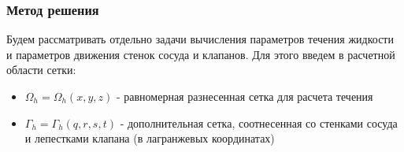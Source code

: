 \documentclass[14pt]{beamer}
\begin{document}
\begin{frame}
\frametitle{Метод решения}
Будем рассматривать отдельно задачи вычисления параметров течения жидкости и параметров движения стенок сосуда и клапанов. Для этого введем в расчетной области сетки:
\begin{itemize}
    \item[\MVRightarrow] $\Omega_h = \Omega_h(x, y, z)$ - равномерная разнесенная сетка для расчета течения
    \item[\MVRightarrow] $\Gamma_h = \Gamma_h(q, r, s, t)$ - дополнительная сетка, соотнесенная со стенками сосуда и лепестками клапана (в лагранжевых координатах)
\end{itemize}

\end{frame}
\end{document}
